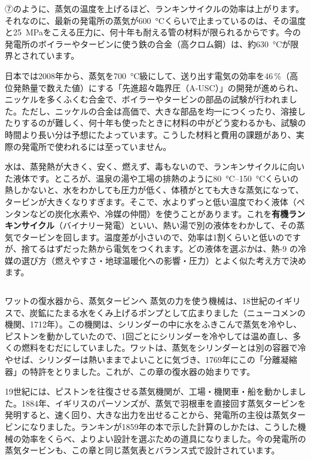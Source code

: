 \begin{phmada}[蒸気をもっと熱くできないのはなぜ？]
⑦のように、蒸気の温度を上げるほど、ランキンサイクルの効率は上がります。それなのに、最新の発電所の蒸気が\qty{600}{\celsius}くらいで止まっているのは、その温度と\qty{25}{MPa}をこえる圧力に、何十年も耐える管の材料が限られるからです。今の発電所のボイラーやタービンに使う鉄の合金（高クロム鋼）は、約\qty{630}{\celsius}が限界とされています。

日本では2008年から、蒸気を\qty{700}{\celsius}級にして、送り出す電気の効率を46\,\%（高位発熱量で数えた値）にする「先進超々臨界圧（A-USC）」の開発が進められ、ニッケルを多くふくむ合金で、ボイラーやタービンの部品の試験が行われました。ただし、ニッケルの合金は高価で、大きな部品を均一につくったり、溶接したりするのが難しく、何十年も使ったときに材料の中がどう変わるかも、試験の時間より長い分は予想にたよっています。こうした材料と費用の課題があり、実際の発電所で使われるには至っていません。
\end{phmada}

\begin{motto}[4]
水は、蒸発熱が大きく、安く、燃えず、毒もないので、ランキンサイクルに向いた液体です。ところが、温泉の湯や工場の排熱のように\qtyrange{80}{150}{\celsius}くらいの熱しかないと、水をわかしても圧力が低く、体積がとても大きな蒸気になって、タービンが大きくなりすぎます。そこで、水よりずっと低い温度でわく液体（ペンタンなどの炭化水素や、冷媒の仲間）を使うことがあります。これを\textbf{有機ランキンサイクル}（バイナリー発電）といい、熱い湯で別の液体をわかして、その蒸気でタービンを回します。温度差が小さいので、効率は1割くらいと低いのですが、捨てるはずだった熱から電気をつくれます。どの液体を選ぶかは、熱-9 の冷媒の選び方（燃えやすさ・地球温暖化への影響・圧力）とよく似た考え方で決めます。
\end{motto}

\begin{column}{ワットの復水器から、蒸気タービンへ}
蒸気の力を使う機械は、18世紀のイギリスで、炭鉱にたまる水をくみ上げるポンプとして広まりました（ニューコメンの機関、1712年）。この機関は、シリンダーの中に水をふきこんで蒸気を冷やし、ピストンを動かしていたので、1回ごとにシリンダーを冷やしては温め直し、多くの燃料をむだにしていました。ワットは、蒸気をシリンダーとは別の容器で冷やせば、シリンダーは熱いままでよいことに気づき、1769年にこの「分離凝縮器」の特許をとりました。これが、この章の復水器の始まりです。

19世紀には、ピストンを往復させる蒸気機関が、工場・機関車・船を動かしました。1884年、イギリスのパーソンズが、蒸気で羽根車を直接回す蒸気タービンを発明すると、速く回り、大きな出力を出せることから、発電所の主役は蒸気タービンになりました。ランキンが1859年の本で示した計算のしかたは、こうした機械の効率をくらべ、よりよい設計を選ぶための道具になりました。今の発電所の蒸気タービンも、この章と同じ蒸気表とバランス式で設計されています。
\end{column}

